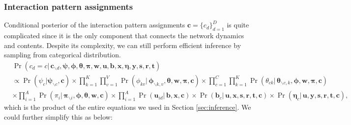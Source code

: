 \documentclass[ba]{imsart}
\numberwithin{equation}{section}
\theoremstyle{plain}
\begin{document}
	\subsubsection{Interaction pattern assignments}
	Conditional posterior of the interaction pattern assignments $\boldsymbol{c}=\{c_d\}_{d=1}^D$ is quite complicated since it is the only component that connects the network dynamics and contents. Despite its complexity, we can still perform efficient inference by sampling from categorical distribution.
		\begin{equation}
		\begin{aligned}
	&	\Pr(c_d=c|\,\boldsymbol{c}_{\backslash d},\boldsymbol{\psi},\boldsymbol{\phi},\boldsymbol{\theta},\boldsymbol{\pi},\boldsymbol{w},\boldsymbol{u},\boldsymbol{b},\boldsymbol{x},\boldsymbol{\eta},\boldsymbol{y},\boldsymbol{s}, \boldsymbol{r},\boldsymbol{t}) \\& \propto \Pr(\psi_c|\boldsymbol{\psi}_{\backslash c}, \boldsymbol{c}) \times 	\prod_{k=1}^K\prod_{v=1}^V\Pr(\phi_{kv}|\,\boldsymbol{\phi}_{\backslash k,v},\boldsymbol{\theta},\boldsymbol{w},\boldsymbol{\pi},\boldsymbol{c}) \times \prod_{c=1}^C\prod_{k=1}^K	\Pr(\theta_{ck}|\,\boldsymbol{\theta}_{\backslash c,k},\boldsymbol{\phi},\boldsymbol{w},\boldsymbol{\pi},\boldsymbol{c})\\&
	\times	\prod_{i=1}^A\Pr(\pi_i|\,\boldsymbol{\pi}_{\backslash i},\boldsymbol{\phi},\boldsymbol{\theta},\boldsymbol{w},\boldsymbol{c}) \times \prod_{i=1}^A\Pr(\boldsymbol{u}_{id}| \, \boldsymbol{b}, \boldsymbol{x},\boldsymbol{c}) \times \Pr(\boldsymbol{b}_c| \,\boldsymbol{u}, \boldsymbol{x}, \boldsymbol{s}, \boldsymbol{r},\boldsymbol{t},\boldsymbol{c}) \times  \Pr(\boldsymbol{\eta}_c|\, \boldsymbol{u}, \boldsymbol{y},\boldsymbol{s}, \boldsymbol{r},\boldsymbol{t},\boldsymbol{c}),
		\end{aligned}	
		\end{equation}
		which is the product of the entire equations we used in Section \ref{sec:inference}. We could further simplify this as below:
\end{document}
